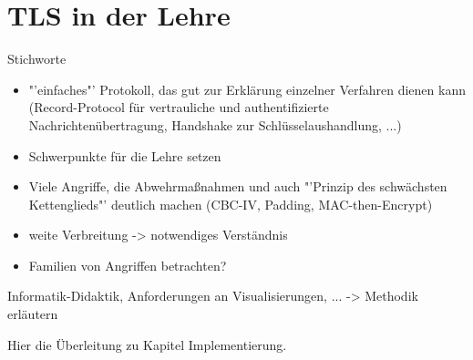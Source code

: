 \chapter{TLS in der Lehre}

Stichworte

\begin{itemize}
	\item "'einfaches"' Protokoll, das gut zur Erklärung einzelner Verfahren dienen kann (Record-Protocol für vertrauliche und authentifizierte Nachrichtenübertragung, Handshake zur Schlüsselaushandlung, ...)
	\item Schwerpunkte für die Lehre setzen
	\item Viele Angriffe, die Abwehrmaßnahmen und auch "'Prinzip des schwächsten Kettenglieds"' deutlich machen (CBC-IV, Padding, MAC-then-Encrypt)
	\item weite Verbreitung -> notwendiges Verständnis
	\item Familien von Angriffen betrachten?
\end{itemize}

Informatik-Didaktik, Anforderungen an Visualisierungen, ... -> Methodik erläutern

Hier die Überleitung zu Kapitel Implementierung. 